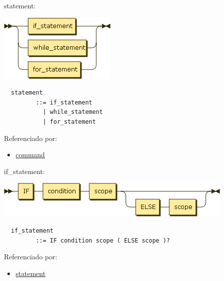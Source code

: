 \begin{minipage}{\textwidth}
  \protect\hypertarget{statement}{}{statement:}

  \includegraphics[width=2.25000in,height=1.29167in]{diagram/statement.png}

  \begin{verbatim}
  statement
         ::= if_statement
           | while_statement
           | for_statement
  \end{verbatim}

  Referenciado por:

  \begin{itemize}
      \tightlist%
    \item
      \protect\hyperlink{command}{command}
  \end{itemize}

\end{minipage}

\begin{minipage}{\textwidth}
  \protect\hypertarget{if_statement}{}{if\_statement:}

  \includegraphics[width=4.56250in,height=0.70833in]{diagram/if_statement.png}

  \begin{verbatim}
  if_statement
         ::= IF condition scope ( ELSE scope )?
  \end{verbatim}

  Referenciado por:

  \begin{itemize}
      \tightlist%
    \item
      \protect\hyperlink{statement}{statement}
  \end{itemize}

\end{minipage}

